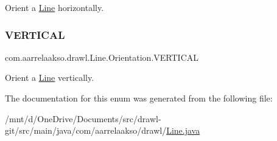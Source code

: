 Orient a \hyperlink{classcom_1_1aarrelaakso_1_1drawl_1_1_line}{Line} horizontally. \mbox{\label{enumcom_1_1aarrelaakso_1_1drawl_1_1_line_1_1_orientation_ae5abbefd554c0775da068445e8bd65ae}} 
\subsubsection{\texorpdfstring{V\+E\+R\+T\+I\+C\+AL}{VERTICAL}}
{\footnotesize\ttfamily com.\+aarrelaakso.\+drawl.\+Line.\+Orientation.\+V\+E\+R\+T\+I\+C\+AL}

Orient a \hyperlink{classcom_1_1aarrelaakso_1_1drawl_1_1_line}{Line} vertically. 

The documentation for this enum was generated from the following file\+:\begin{DoxyCompactItemize}
\item 
/mnt/d/\+One\+Drive/\+Documents/src/drawl-\/git/src/main/java/com/aarrelaakso/drawl/\hyperlink{_line_8java}{Line.\+java}\end{DoxyCompactItemize}
